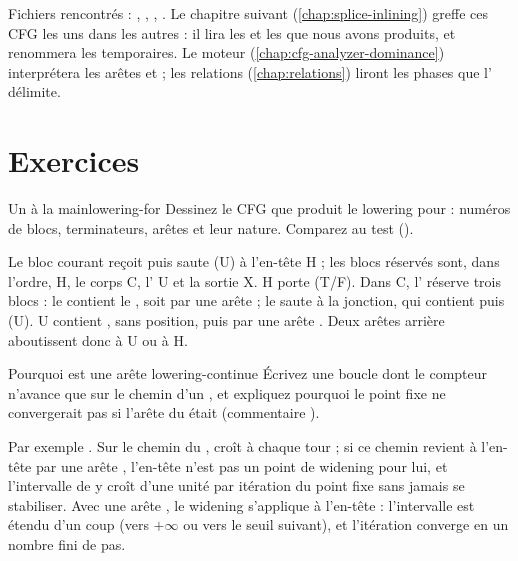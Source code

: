 \begin{resume}
Fichiers rencontrés : , , , . Le chapitre suivant (\cref{chap:splice-inlining}) greffe ces CFG les uns dans les autres : il lira les  et les  que nous avons produits, et renommera les temporaires. Le moteur (\cref{chap:cfg-analyzer-dominance}) interprétera les arêtes  et  ; les relations (\cref{chap:relations}) liront les phases que l' délimite.
\end{resume}

\section*{Exercices}

\begin{exercice}{Un  à la main}{lowering-for}
Dessinez le CFG que produit le lowering pour  : numéros de blocs, terminateurs, arêtes et leur nature. Comparez au test  ().
\end{exercice}
\begin{solution}
Le bloc courant reçoit  puis saute (U) à l'en-tête H ; les blocs réservés sont, dans l'ordre, H, le corps C, l' U et la sortie X. H porte  (T/F). Dans C, l' réserve trois blocs : le  contient le , soit  par une arête  ; le  saute à la jonction, qui contient  puis  (U). U contient ,  sans position, puis  par une arête . Deux arêtes arrière aboutissent donc à U ou à H.
\end{solution}

\begin{exercice}{Pourquoi  est une arête }{lowering-continue}
Écrivez une boucle dont le compteur n'avance que sur le chemin d'un , et expliquez pourquoi le point fixe ne convergerait pas si l'arête du  était  (commentaire ).
\end{exercice}
\begin{solution}
Par exemple . Sur le chemin du ,  croît à chaque tour ; si ce chemin revient à l'en-tête par une arête , l'en-tête n'est pas un point de widening pour lui, et l'intervalle de  y croît d'une unité par itération du point fixe sans jamais se stabiliser. Avec une arête , le widening s'applique à l'en-tête : l'intervalle est étendu d'un coup (vers $+\infty$ ou vers le seuil suivant), et l'itération converge en un nombre fini de pas.
\end{solution}

